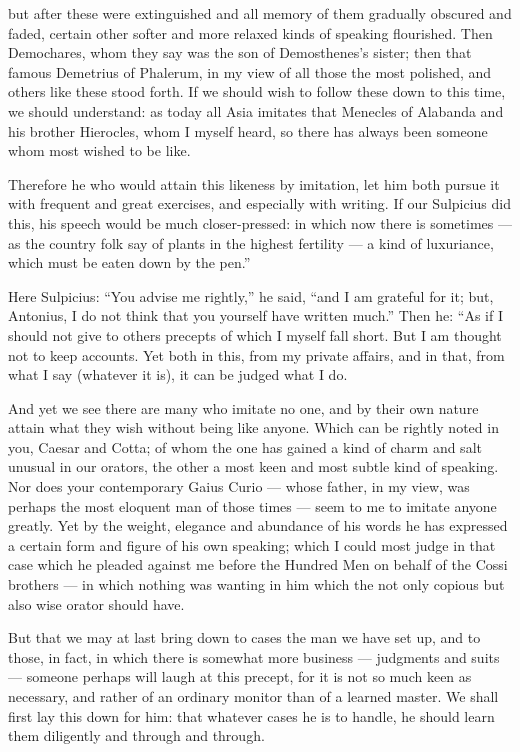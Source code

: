  but after these were extinguished and all memory of them gradually obscured and faded, certain other softer and more relaxed kinds of speaking flourished. Then Demochares, whom they say was the son of Demosthenes's sister; then that famous Demetrius of Phalerum, in my view of all those the most polished, and others like these stood forth. If we should wish to follow these down to this time, we should understand: as today all Asia imitates that Menecles of Alabanda and his brother Hierocles, whom I myself heard, so there has always been someone whom most wished to be like.

 Therefore he who would attain this likeness by imitation, let him both pursue it with frequent and great exercises, and especially with writing. If our Sulpicius did this, his speech would be much closer-pressed: in which now there is sometimes — as the country folk say of plants in the highest fertility — a kind of luxuriance, which must be eaten down by the pen.''

 Here Sulpicius: ``You advise me rightly,'' he said, ``and I am grateful for it; but, Antonius, I do not think that you yourself have written much.'' Then he: ``As if I should not give to others precepts of which I myself fall short. But I am thought not to keep accounts. Yet both in this, from my private affairs, and in that, from what I say (whatever it is), it can be judged what I do.

 And yet we see there are many who imitate no one, and by their own nature attain what they wish without being like anyone. Which can be rightly noted in you, Caesar and Cotta; of whom the one has gained a kind of charm and salt unusual in our orators, the other a most keen and most subtle kind of speaking. Nor does your contemporary Gaius Curio — whose father, in my view, was perhaps the most eloquent man of those times — seem to me to imitate anyone greatly. Yet by the weight, elegance and abundance of his words he has expressed a certain form and figure of his own speaking; which I could most judge in that case which he pleaded against me before the Hundred Men on behalf of the Cossi brothers — in which nothing was wanting in him which the not only copious but also wise orator should have.

 But that we may at last bring down to cases the man we have set up, and to those, in fact, in which there is somewhat more business — judgments and suits — someone perhaps will laugh at this precept, for it is not so much keen as necessary, and rather of an ordinary monitor than of a learned master. We shall first lay this down for him: that whatever cases he is to handle, he should learn them diligently and through and through.

